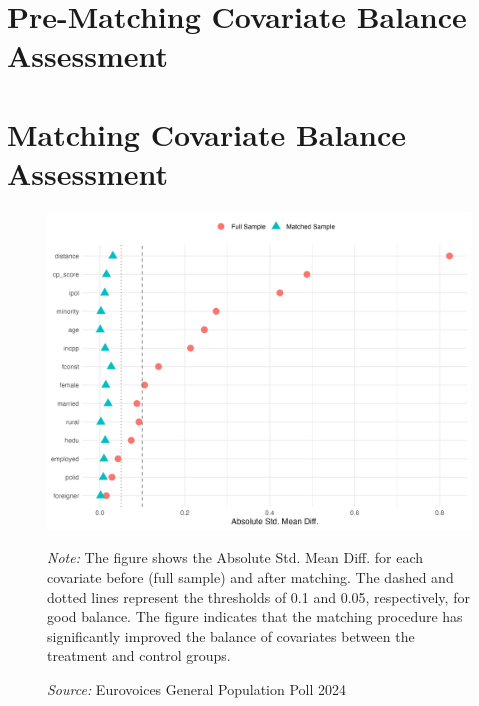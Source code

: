 \documentclass{article}
\begin{document}
\newpage
\section{Pre-Matching Covariate Balance Assessment}
\label{appendix:b}


\newpage
\section{Matching Covariate Balance Assessment}
\label{appendix:c}
\begin{figure}[htbp]
\centering
\includegraphics[width=\textwidth]{"viz/loveplot.png"}

\medskip
\justifying\footnotesize 
\textit{Note:} The figure shows the Absolute Std. Mean Diff. for each covariate before (full sample) and after matching. The dashed and dotted lines represent the thresholds of 0.1 and 0.05, respectively, for good balance. The figure indicates that the matching procedure has significantly improved the balance of covariates between the treatment and control groups.

\textit{Source:} Eurovoices General Population Poll 2024
\end{figure}

\newpage
\end{document}
